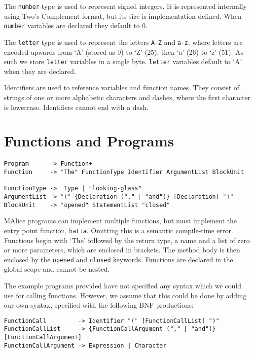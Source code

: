 \documentclass[a4wide, 11pt]{article}
\begin{document}
The \texttt{number} type is used to represent signed integers. It is represented internally using Two's Complement format, but its size is implementation-defined. When \texttt{number} variables are declared they default to 0.

The \texttt{letter} type is used to represent the letters \texttt{A-Z} and \texttt{a-z}, where letters are encoded upwards from `A' (stored as 0) to `Z' (25), then `a' (26) to `z' (51). As such we store \texttt{letter} variables in a single byte. \texttt{letter} variables default to `A' when they are declared.

Identifiers are used to reference variables and function names. They consist of strings of one or more alphabetic characters and dashes, where the first character is lowercase. Identifiers cannot end with a dash.

\section{Functions and Programs}

\begin{verbatim}
Program      -> Function+
Function     -> "The" FunctionType Identifier ArgumentList BlockUnit

FunctionType ->  Type | "looking-glass"
ArgumentList -> "(" {Declaration ("," | "and")} [Declaration] ")"
BlockUnit    -> "opened" StatementList "closed"
\end{verbatim}

MAlice programs can implement multiple functions, but must implement the entry point function, \texttt{hatta}. Omitting this is a semantic compile-time error. Functions begin with `The' followed by the return type, a name and a list of zero or more parameters, which are enclosed in brackets. The method body is then enclosed by the \texttt{opened} and \texttt{closed} keywords. Functions are declared in the global scope and cannot be nested. 

The example programs provided have not specified any syntax which we could use for calling functions. However, we assume that this could be done by adding our own syntax, specified with the following BNF productions:

\begin{verbatim}
FunctionCall         -> Identifier "(" [FunctionCallList] ")"
FunctionCallList     -> {FunctionCallArgument ("," | "and")} [FunctionCallArgument]
FunctionCallArgument -> Expression | Character
\end{verbatim}
\end{document}
